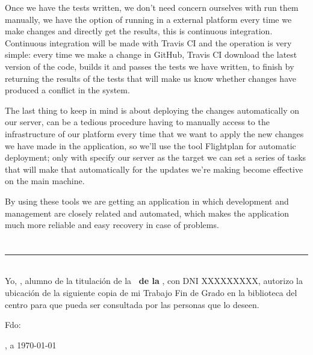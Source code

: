 {\bigskip
Once we have the tests written, we don't need concern ourselves with run them manually, we have the option of running in a 
external platform every time we make changes and directly get the results, this is continuous integration. Continuous 
integration will be made with Travis CI and the operation is very simple: every time we make a change in GitHub, Travis CI 
download the latest version of the code, builds it and passes the tests we have written, to finish by returning the results 
of the tests that will make us know whether changes have produced a conflict in the system. 

\bigskip
The last thing to keep in mind is about deploying the changes automatically on our server, can be a tedious procedure having 
to manually access to the infrastructure of our platform every time that we want to apply the new changes we have made in the 
application, so we'll use the tool Flightplan for automatic deployment; only with specify our server as the target we can set 
a series of tasks that will make that automatically for the updates we're making become effective on the main machine.

\bigskip
By using these tools we are getting an application in which development and management are closely related and automated, which
makes the application much more reliable and easy recovery in case of problems.

\chapter*{}
\thispagestyle{empty}

\noindent\rule[-1ex]{\textwidth}{2pt}\\[4.5ex]

Yo, \textbf{\autor}, alumno de la titulación \titulacion de la \textbf{\escuela\ de la \universidad}, con DNI XXXXXXXXX, 
autorizo la ubicación de la siguiente copia de mi Trabajo Fin de Grado en la biblioteca del centro para que pueda ser
consultada por las personas que lo deseen.

\vspace{6cm}

\noindent Fdo: \autor

\vspace{2cm}

\begin{flushright}
\ciudad, a \today
\end{flushright}

\chapter*{}
\thispagestyle{empty}

}
